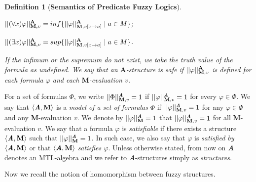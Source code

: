 \documentclass{IOS-Book-Article}
\newtheorem{defi}{Definition}
\begin{document}
\begin{defi} [\textbf{Semantics of Predicate Fuzzy Logics}]
\begin{description}
\item $||(\forall x)\varphi||^{\small{\textbf{A}}}_{\mathrm{\mathbf{M}},v}=inf\{||\varphi||^{\small{\textbf{A}}}_{\mathrm{\mathbf{M}},v[x\rightarrow a]}\mid a\in M\}$;

\item $||(\exists x)\varphi||^{\small{\textbf{A}}}_{\mathrm{\mathbf{M}},v}=sup\{||\varphi||^{\small{\textbf{A}}}_{\mathrm{\mathbf{M}},v[x\rightarrow a]}\mid a\in M\}$.

\end{description}
If the infimum or the supremum do not exist, we take the truth value of the formula as undefined. We say that an $\textbf{A}$-structure is \emph{safe} if $||\varphi||^{\small{\textbf{A}}}_{\mathrm{\mathbf{M}},v}$ is defined for each formula $\varphi$ and each $\mathrm{\mathbf{M}}$-evaluation $v$. \end{defi}


 \noindent For a set of formulas $\Phi$, we write $||\Phi||^{\emph{\textbf{A}}}_{\mathrm{\mathbf{M}},v}=1$ if $||\varphi||^{\emph{\textbf{A}}}_{\mathrm{\mathbf{M}},v}=1$ for every $\varphi\in\Phi$. We say that $\langle\emph{\textbf{A}},\mathrm{\mathbf{M}}\rangle$ is a \emph{model of a set of formulas $\Phi$} if $||\varphi ||^{\emph{\textbf{A}}}_{\mathrm{\mathbf{M}},v}=1$ for any $\varphi\in\Phi$ and any \textbf{M}-evaluation $v$. We denote by $||\varphi||^{\emph{\textbf{A}}}_{\textbf{M}}=1$ that $||\varphi||^{\emph{\textbf{A}}}_{\textbf{M},v}=1$ for all \textbf{M}-evaluation $v$. We say that a formula $\varphi$ is \emph{satisfiable} if there exists a structure $\langle\emph{\textbf{{A}}},\textbf{M}\rangle$ such that $||\varphi||^{\emph{\textbf{A}}}_{\textbf{M}}=1$. In such case, we also say that $\varphi$ is \emph{satisfied by} $\langle\emph{\textbf{{A}}}, \textbf{M}\rangle$ or that $\langle\emph{\textbf{{A}}},\textbf{M}\rangle$ \emph{satisfies $\varphi$}.  Unless otherwise stated, from now on \emph{\textbf{A}} denotes an MTL-algebra and we refer to \emph{\textbf{A}}-structures simply as \emph{structures}. \smallskip

Now we recall the notion of homomorphism between fuzzy structures.
\end{document}
